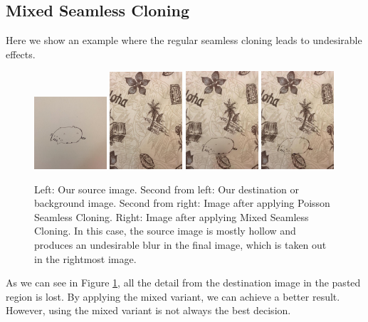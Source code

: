 \documentclass[12pt]{article}
\begin{document}
\subsection{Mixed Seamless Cloning}
Here we show an example where the regular seamless cloning leads to undesirable effects. 
\noindent\begin{figure}[H]
\centering
\includegraphics[width=0.24\textwidth,keepaspectratio]{data/MixedSeamlessCloning/mixed2/cat.jpg}
\includegraphics[width=0.24\textwidth,keepaspectratio]{data/MixedSeamlessCloning/mixed2/hawaii.jpg}
\includegraphics[width=0.24\textwidth,keepaspectratio]{data/MixedSeamlessCloning/mixed2/cloned.jpg}
\includegraphics[width=0.24\textwidth,keepaspectratio]{data/MixedSeamlessCloning/mixed2/mixed_cloned.jpg}
\caption{Left: Our source image. Second from left: Our destination or background image. Second from right: Image after applying Poisson Seamless Cloning. Right: Image after applying Mixed Seamless Cloning. In this case, the source image is mostly hollow and produces an undesirable blur in the final image, which is taken out in the rightmost image.}
\label{cat-island}
\end{figure}
As we can see in Figure \ref{cat-island}, all the detail from the destination image in the pasted region is lost. By applying the mixed variant, we can achieve a better result. However, using the mixed variant is not always the best decision.
\end{document}
